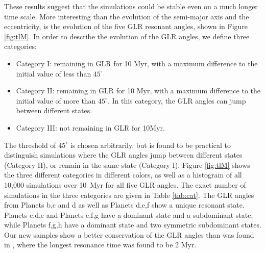 \documentclass[fleqn,usenatbib]{mnras} %
\begin{document}
These results suggest that the simulations could be stable even on a much longer time scale. 
More interesting than the evolution of the semi-major axis and the eccentricity, is the evolution of the five GLR resonant angles, shown in Figure \ref{fig:tlM}. In order to describe the evolution of the GLR angles, we define three categories: 
\begin{itemize}
    \item Category I: remaining in GLR for 10 Myr, with a maximum difference to the initial value of less than $45^\circ$
    \item Category II: remaining in GLR for 10 Myr, with a maximum difference to the initial value of more than $45^\circ$. In this category, the GLR angles can jump between different states. 
    \item Category III: not remaining in GLR for 10Myr. 
\end{itemize}
The threshold of $45^\circ$ is chosen arbitrarily, but is found to be practical to distinguish simulations where the GLR angles jump between different states (Category II), or remain in the same state (Category I). Figure \ref{fig:tlM} shows the three different categories in different colors, as well as a histogram of all 10,000 simulations over 10~Myr for all five GLR angles.  The exact number of simulations in the three categories are given in Table \ref{tab:cat}. The GLR angles from Planets b,c and d as well as Planets d,e,f show a unique resonant state. Planets c,d,e and Planets e,f,g have a dominant state and a subdominant state, while Planets f,g,h have a dominant state and two symmetric subdominant states.
Our new samples show a better conservation of the GLR angles than was found in \citep{Grimm2018}, where the longest resonance time was found to be 2 Myr. 


\end{document}
